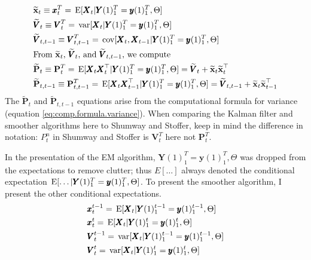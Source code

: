 \documentclass[]{article}
\def\PP{\mbox{$\mathbf P$}}  \def\pp{\mbox{$\mathbf p$}}
\def\VV{\mbox{$\pmb{V}$}}	\def\vv{\mbox{$\pmb{v}$}}
\def\XX{\mbox{$\pmb{X}$}}	\def\xx{\mbox{$\pmb{x}$}}
\def\YY{\mbox{$\pmb{Y}$}}	\def\yy{\mbox{$\pmb{y}$}}
\def\E{\,\textup{\textrm{E}}}
\def\var{\,\textup{\textrm{var}}}
\def\cov{\,\textup{\textrm{cov}}}
\def\hatxt{\widetilde{\mbox{$\mathbf x$}}_t}
\def\hatxtm{\widetilde{\mbox{$\mathbf x$}}_{t-1}}
\def\hatPt{\widetilde{\PP}_t}
\def\hatPttm{\widetilde{\PP}_{t,t-1}}
\begin{document}
\begin{subequations}\label{eq:kfsoutput}
\begin{align}
&\hatxt \equiv \xx_t^T = \E[\XX_t|\YY(1)_1^T=\yy(1)_1^T,\Theta]\label{eq:xt}\\
&\widetilde{\VV}_t \equiv \VV_t^T = \var[\XX_t|\YY(1)_1^T=\yy(1)_1^T,\Theta]\\
&\widetilde{\VV}_{t,t-1} \equiv \VV_{t,t-1}^T = \cov[\XX_t,\XX_{t-1}|\YY(1)_1^T=\yy(1)_1^T,\Theta]\\
&\text{From $\hatxt$, $\widetilde{\VV}_t$, and $\widetilde{\VV}_{t,t-1}$, we compute}\nonumber\\
&\hatPt \equiv \PP_t^T =\E[\XX_t\XX_t^\top|\YY(1)_1^T=\yy(1)_1^T,\Theta]= \widetilde{\VV}_t + \hatxt\hatxt^\top\label{eq:Pt}\\
&\hatPttm \equiv \PP_{t,t-1}^T =\E[\XX_{t}\XX_{t-1}^\top|\YY(1)_1^T=\yy(1)_1^T,\Theta]=\widetilde{\VV}_{t,t-1} +\hatxt\hatxtm^\top\label{eq:Ptt1}
\end{align}
\end{subequations}
The $\hatPt$ and $\hatPttm$ equations arise from the computational formula for variance (equation \ref{eq:comp.formula.variance}). When comparing the Kalman filter and smoother algorithms here to Shumway and Stoffer, keep in mind the difference in notation: $P_t^n$ in Shumway and Stoffer is $\VV_t^T$ here not $\PP_t^T$.

In the presentation of the EM algorithm, $\YY(1)_1^T=\yy(1)_1^T,\Theta$ was dropped from the expectations to remove clutter; thus $E[\dots]$ always denoted the conditional expectation $\E[\dots|\YY(1)_1^T=\yy(1)_1^T,\Theta]$. To present the smoother algorithm, I present the other conditional expectations.
\begin{subequations}\label{eq:kffilteroutput}
\begin{align}
&\xx_t^{t-1} = \E[\XX_t|\YY(1)_1^{t-1}=\yy(1)_1^{t-1},\Theta]\\
&\xx_t^t = \E[\XX_t|\YY(1)_1^t=\yy(1)_1^t,\Theta]\\
&\VV_t^{t-1} = \var[\XX_t|\YY(1)_1^{t-1}=\yy(1)_1^{t-1},\Theta]\\
&\VV_t^t = \var[\XX_t|\YY(1)_1^t=\yy(1)_1^t,\Theta]\\
\end{align}
\end{subequations}
\end{document}
